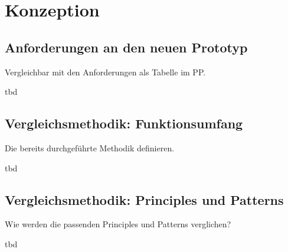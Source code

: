 \section{Konzeption}

\subsection{Anforderungen an den neuen Prototyp}
\color{red}
Vergleichbar mit den Anforderungen als Tabelle im PP.

tbd
\color{black}

\subsection{Vergleichsmethodik: Funktionsumfang}
\color{red}
Die bereits durchgeführte Methodik definieren.

tbd
\color{black}

\subsection{Vergleichsmethodik: Principles und Patterns}
\color{red}
Wie werden die passenden Principles und Patterns verglichen?

tbd
\color{black}
